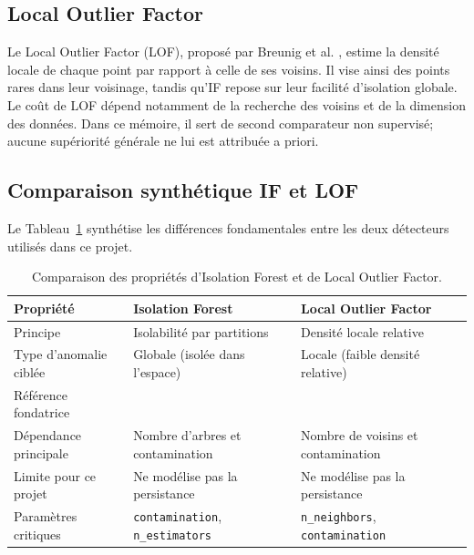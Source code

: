 \subsection{Local Outlier Factor}
Le Local Outlier Factor (LOF), proposé par Breunig et al. \citep{breunig2000lof}, estime la
densité locale de chaque point par rapport à celle de ses voisins. Il vise ainsi des points
rares dans leur voisinage, tandis qu'IF repose sur leur facilité d'isolation globale. Le coût
de LOF dépend notamment de la recherche des voisins et de la dimension des données. Dans ce
mémoire, il sert de second comparateur non supervisé; aucune supériorité générale ne lui est
attribuée a priori.

\subsection{Comparaison synthétique IF et LOF}
Le Tableau~\ref{tab:if_vs_lof} synthétise les différences fondamentales entre les deux
détecteurs utilisés dans ce projet.

\begin{table}[H]
    \centering
    \caption{Comparaison des propriétés d'Isolation Forest et de Local Outlier Factor.}
    \label{tab:if_vs_lof}
    \begin{tabular}{>{\raggedright\arraybackslash}p{3.2cm}
                    >{\raggedright\arraybackslash}p{5.0cm}
                    >{\raggedright\arraybackslash}p{5.0cm}}
        \toprule
        \textbf{Propriété}            & \textbf{Isolation Forest}
            & \textbf{Local Outlier Factor} \\
        \midrule
        Principe                      & Isolabilité par partitions
            & Densité locale relative \\
        Type d'anomalie ciblée        & Globale (isolée dans l'espace)
            & Locale (faible densité relative) \\
        Référence fondatrice          & \citet{liu2008isolation}
            & \citet{breunig2000lof} \\
        Dépendance principale         & Nombre d'arbres et contamination
            & Nombre de voisins et contamination \\
        Limite pour ce projet         & Ne modélise pas la persistance
            & Ne modélise pas la persistance \\
        Paramètres critiques          & \texttt{contamination}, \texttt{n\_estimators}
            & \texttt{n\_neighbors}, \texttt{contamination} \\
        \bottomrule
    \end{tabular}
\end{table}

